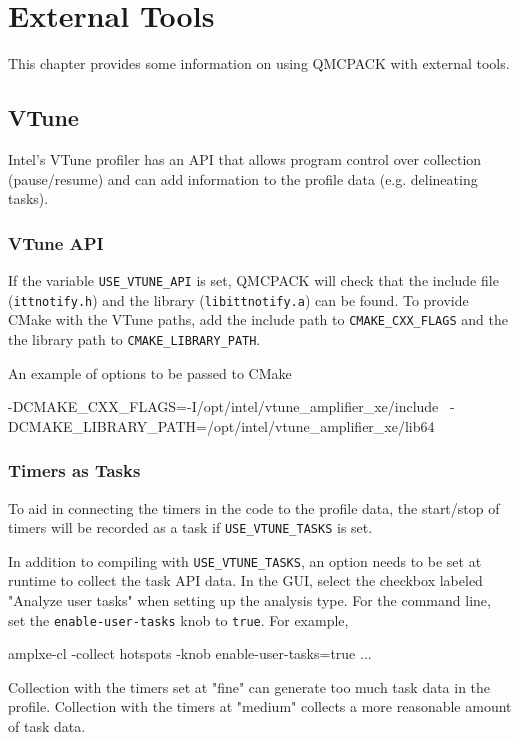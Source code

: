 \chapter{External Tools}
\label{chap:external_tools}
This chapter provides some information on using QMCPACK with external tools.

\section{VTune}

Intel's VTune profiler has an API that allows program control over collection (pause/resume) and can add information to the profile data (e.g. delineating tasks).

\subsection{VTune API}

If the variable \texttt{USE\_VTUNE\_API} is set, QMCPACK will check that the
include file (\texttt{ittnotify.h}) and the library (\texttt{libittnotify.a}) can
be found.
To provide CMake with the VTune paths, add the include path to \texttt{CMAKE\_CXX\_FLAGS} and the the library path to \texttt{CMAKE\_LIBRARY\_PATH}.

An example of options to be passed to CMake
\begin{shade}
 -DCMAKE_CXX_FLAGS=-I/opt/intel/vtune_amplifier_xe/include \
 -DCMAKE_LIBRARY_PATH=/opt/intel/vtune_amplifier_xe/lib64
\end{shade}


\subsection{Timers as Tasks}
To aid in connecting the timers in the code to the profile data, the start/stop of
timers will be recorded as a task if \texttt{USE\_VTUNE\_TASKS} is set.

In addition to compiling with \texttt{USE\_VTUNE\_TASKS}, an option needs to be set at runtime to collect the task API data.
In the GUI, select the checkbox labeled "Analyze user tasks" when setting up the analysis type.
For the command line, set the \texttt{enable-user-tasks} knob to \texttt{true}. For example,
\begin{shade}
amplxe-cl -collect hotspots -knob enable-user-tasks=true ...
\end{shade}

Collection with the timers set at "fine" can generate too much task data in the profile.
Collection with the timers at "medium" collects a more reasonable amount of task data.
